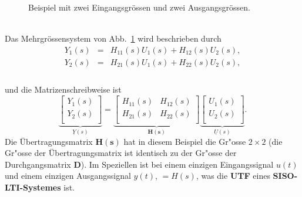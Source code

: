 \bsp{}
\begin{figure}[!htb]
\vspace*{-4mm}\begin{center}
  \vspace*{-3mm}\caption{Beispiel mit zwei Eingangsgr\"ossen und zwei Ausgangsgr\"ossen.}\label{ZVD_ABB_MEHRG}
\end{center}
\vspace*{-6mm}
\end{figure}\\
Das Mehrgr\"ossensystem von Abb.~\ref{ZVD_ABB_MEHRG} wird beschrieben durch\\
\begin{eqnarray*}
 Y_1(s) &=& H_{11}(s) U_1(s) + H_{12}(s) U_2(s),\\
 Y_2(s) &=& H_{21}(s) U_1(s) + H_{22}(s) U_2(s),\\
\end{eqnarray*}\\
und die Matrizenschreibweise ist
\begin{equation*}
\underbrace{\left [
\begin{array}{c}
 Y_1(s)\\
Y_2(s)\\
\end{array}
\right ]}_{\underline{Y}(s)}=
\underbrace{
\left [
\begin{array}{cc}
 H_{11}(s) & H_{12}(s)\\
 H_{21}(s) & H_{22}(s)\\
\end{array}
\right ]}_{\boldsymbol{H(s)}}
\underbrace{\left [
\begin{array}{c}
 U_1(s)\\
U_2(s)\\
\end{array}
\right ]}_{\underline{U}(s)}.
\end{equation*}
Die \"Ubertragungsmatrix ${\boldsymbol{H(s)}}$ hat in diesem Beispiel die Gr"osse $2\times 2$ (die Gr"osse der \"Ubertragungsmatrix ist identisch zu der Gr"osse der Durchgangsmatrix ${\boldsymbol{D}}$). Im Speziellen ist bei einem einzigen Eingangssignal $u(t)$ und einem einzigen Ausgangssignal $y(t)$, $=H(s)$, was die {\bf UTF} eines {\bf SISO-LTI-Systemes} ist.

